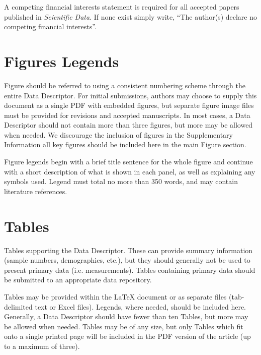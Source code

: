 \documentclass[english]{article}
\begin{document}
A competing financial interests statement is required for all accepted
papers published in \emph{Scientific Data}. If none exist simply write,
``The author(s) declare no competing financial interests''.


\section*{Figures Legends}

Figure should be referred to using a consistent numbering scheme through
the entire Data Descriptor. For initial submissions, authors may choose
to supply this document as a single PDF with embedded figures, but
separate figure image files must be provided for revisions and accepted
manuscripts. In most cases, a Data Descriptor should not contain more
than three figures, but more may be allowed when needed. We discourage
the inclusion of figures in the Supplementary Information \textendash{}
all key figures should be included here in the main Figure section. 

Figure legends begin with a brief title sentence for the whole figure
and continue with a short description of what is shown in each panel,
as well as explaining any symbols used. Legend must total no more
than 350 words, and may contain literature references. 


\section*{Tables}

Tables supporting the Data Descriptor. These can provide summary information
(sample numbers, demographics, etc.), but they should generally not
be used to present primary data (i.e. measurements). Tables containing
primary data should be submitted to an appropriate data repository. 

Tables may be provided within the \LaTeX{} document or as separate
files (tab-delimited text or Excel files). Legends, where needed,
should be included here. Generally, a Data Descriptor should have
fewer than ten Tables, but more may be allowed when needed. Tables
may be of any size, but only Tables which fit onto a single printed
page will be included in the PDF version of the article (up to a maximum
of three). 
\end{document}
